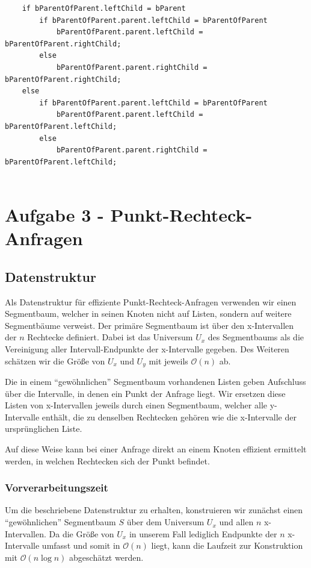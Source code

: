 \documentclass[a4paper]{article}
\begin{document}
\begin{itemize}
\begin{itemize}
\begin{lstlisting}
	if bParentOfParent.leftChild = bParent
		if bParentOfParent.parent.leftChild = bParentOfParent
			bParentOfParent.parent.leftChild = bParentOfParent.rightChild;
		else
			bParentOfParent.parent.rightChild = bParentOfParent.rightChild;
	else
		if bParentOfParent.parent.leftChild = bParentOfParent
			bParentOfParent.parent.leftChild = bParentOfParent.leftChild;
		else
			bParentOfParent.parent.rightChild = bParentOfParent.leftChild;
	
\end{lstlisting}


\end{itemize}

\end{itemize}


\section*{Aufgabe 3 - Punkt-Rechteck-Anfragen}

\subsection*{Datenstruktur}
Als Datenstruktur für effiziente Punkt-Rechteck-Anfragen verwenden wir einen Segmentbaum, 
welcher in seinen Knoten nicht auf Listen, sondern auf weitere Segmentbäume verweist.
Der primäre Segmentbaum ist über den x-Intervallen der $n$ Rechtecke definiert. 
Dabei ist das Universum $U_x$ des Segmentbaums als die Vereinigung aller Intervall-Endpunkte
der x-Intervalle gegeben. Des Weiteren schätzen wir die Größe von $U_x$ und $U_y$ mit jeweils $\mathcal{O}(n)$ ab.

Die in einem "`gewöhnlichen"' Segmentbaum vorhandenen Listen geben Aufschluss über die 
Intervalle, in denen ein Punkt der Anfrage liegt. Wir ersetzen diese Listen von 
x-Intervallen jeweils durch einen Segmentbaum, welcher alle y-Intervalle enthält, 
die zu denselben Rechtecken gehören wie die x-Intervalle der ursprünglichen Liste.

Auf diese Weise kann bei einer Anfrage direkt an einem Knoten effizient ermittelt werden, 
in welchen Rechtecken sich der Punkt befindet. 


\subsubsection*{Vorverarbeitungszeit}
Um die beschriebene Datenstruktur zu erhalten, konstruieren wir zunächst einen
"`gewöhnlichen"' Segmentbaum $S$ über dem Universum $U_x$ und allen 
$n$ x-Intervallen. Da die Größe von $U_x$ in unserem Fall 
lediglich Endpunkte der $n$ x-Intervalle umfasst und somit in $\mathcal{O}(n)$ liegt, 
kann die Laufzeit zur Konstruktion mit $\mathcal{O}(n \log n)$ abgeschätzt werden.
\end{document}
